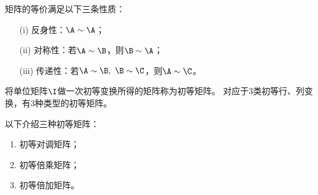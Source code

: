 \begin{frame}\ft{\secname}
\begin{xingzhi}
  矩阵的等价满足以下三条性质：
  \begin{itemize}
  \item[(i)] \textcolor{acolor3}{反身性}：$\A \sim \A$；
  \item[(ii)] \textcolor{acolor3}{对称性}：若$\A \sim \B$，则$\B \sim \A$；
  \item[(iii)] \textcolor{acolor3}{传递性}：若$\A \sim \B, ~\B \sim \C$，则$\A \sim \C$。
  \end{itemize}
\end{xingzhi}
\end{frame}


\begin{frame}\ft{\secname}

\begin{dingyi}[初等矩阵]
  将单位矩阵$\I$做一次初等变换所得的矩阵称为\textcolor{acolor3}{初等矩阵}。
  对应于$3$类初等行、列变换，有$3$种类型的初等矩阵。
\end{dingyi}
\end{frame}


\begin{frame}\ft{\secname}
以下介绍三种初等矩阵：
\begin{enumerate}
\item 初等对调矩阵；
\item 初等倍乘矩阵；
\item 初等倍加矩阵。
\end{enumerate}
\end{frame}


